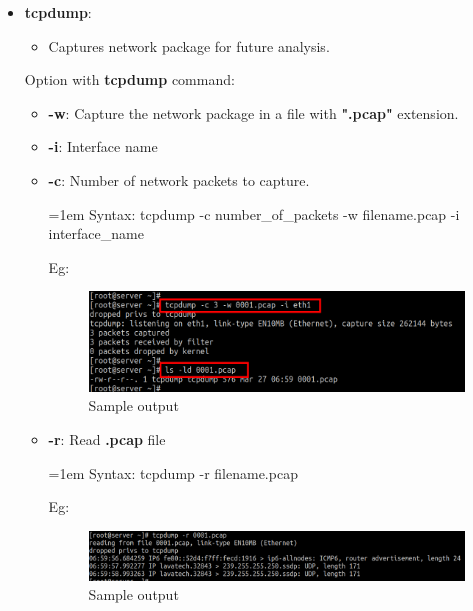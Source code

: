 \begin{flushleft}
\begin{itemize}
\begin{itemize}
	\end{itemize}
	\newpage
	\item \textbf{tcpdump}: 
	\begin{itemize}
		\item Captures network package for future analysis.
	\end{itemize}
	\bigskip
	Option with \textbf{tcpdump} command:
	\begin{itemize}
		\item \textbf{-w}: Capture the network package in a file with \textbf{".pcap"} extension.
		\item \textbf{-i}: Interface name
		\item \textbf{-c}: Number of network packets to capture.
		\begin{tcolorbox}[breakable,notitle,boxrule=0pt,colback=pink,colframe=pink]
			\color{black}
			\font=1em
			Syntax: tcpdump -c number\_of\_packets -w filename.pcap  -i interface\_name
			\font=4pt
		\end{tcolorbox}
		Eg:
		\begin{figure}[h!]
			\centering
			\includegraphics[scale=0.3]{content/chapter15/images/tcpdump_1.png}
			\caption{Sample output}
			\label{fig:output7}
		\end{figure}
	
		\item \textbf{-r}: Read \textbf{.pcap} file
		\begin{tcolorbox}[breakable,notitle,boxrule=0pt,colback=pink,colframe=pink]
			\color{black}
			\font=1em
			Syntax: tcpdump -r filename.pcap
			\font=4pt
		\end{tcolorbox}
		Eg:
		\begin{figure}[h!]
			\centering
			\includegraphics[scale=0.25]{content/chapter15/images/tcpdump_2.png}
			\caption{Sample output}
			\label{fig:output8}
		\end{figure}
		
		
		
	\end{itemize}


	
\end{itemize}

\end{flushleft}
\newpage


